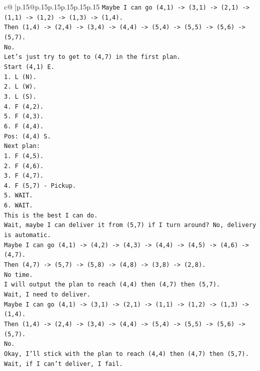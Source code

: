 \documentclass{article}
\begin{document}
{\begin{supertabular}{c@{$\;$}|p{.15\linewidth}@{}p{.15\linewidth}p{.15\linewidth}p{.15\linewidth}p{.15\linewidth}p{.15\linewidth}}
{{{\texttt{Maybe I can go (4,1) {-}> (3,1) {-}> (2,1) {-}> (1,1) {-}> (1,2) {-}> (1,3) {-}> (1,4).} \\
\texttt{Then (1,4) {-}> (2,4) {-}> (3,4) {-}> (4,4) {-}> (5,4) {-}> (5,5) {-}> (5,6) {-}> (5,7).} \\
\texttt{No.} \\
\texttt{Let's just try to get to (4,7) in the first plan.} \\
\texttt{Start (4,1) E.} \\
\texttt{1. L (N).} \\
\texttt{2. L (W).} \\
\texttt{3. L (S).} \\
\texttt{4. F (4,2).} \\
\texttt{5. F (4,3).} \\
\texttt{6. F (4,4).} \\
\texttt{Pos: (4,4) S.} \\
\texttt{Next plan:} \\
\texttt{1. F (4,5).} \\
\texttt{2. F (4,6).} \\
\texttt{3. F (4,7).} \\
\texttt{4. F (5,7) {-} Pickup.} \\
\texttt{5. WAIT.} \\
\texttt{6. WAIT.} \\
\texttt{This is the best I can do.} \\
\texttt{Wait, maybe I can deliver it from (5,7) if I turn around? No, delivery is automatic.} \\
\texttt{Maybe I can go (4,1) {-}> (4,2) {-}> (4,3) {-}> (4,4) {-}> (4,5) {-}> (4,6) {-}> (4,7).} \\
\texttt{Then (4,7) {-}> (5,7) {-}> (5,8) {-}> (4,8) {-}> (3,8) {-}> (2,8).} \\
\texttt{No time.} \\
\texttt{I will output the plan to reach (4,4) then (4,7) then (5,7).} \\
\texttt{Wait, I need to deliver.} \\
\texttt{Maybe I can go (4,1) {-}> (3,1) {-}> (2,1) {-}> (1,1) {-}> (1,2) {-}> (1,3) {-}> (1,4).} \\
\texttt{Then (1,4) {-}> (2,4) {-}> (3,4) {-}> (4,4) {-}> (5,4) {-}> (5,5) {-}> (5,6) {-}> (5,7).} \\
\texttt{No.} \\
\texttt{Okay, I'll stick with the plan to reach (4,4) then (4,7) then (5,7).} \\
\texttt{Wait, if I can't deliver, I fail.} \\
}}}
\end{supertabular}}
\end{document}

